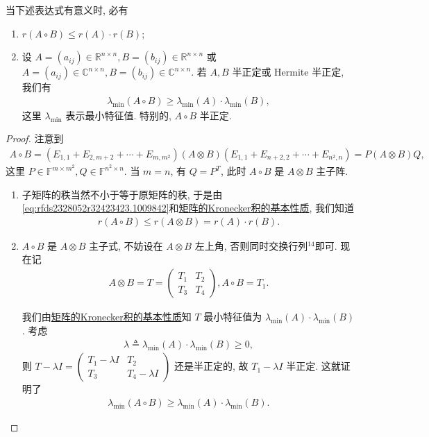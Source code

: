 \documentclass[../../main.tex]{subfiles}
\begin{document}
\begin{theorem}[矩阵的Hadamard积的性质]
当下述表达式有意义时, 必有
\begin{enumerate}
\item $r(A\circ B)\leqslant r(A)\cdot r(B)$;

\item 设 $A=(a_{ij})\in\mathbb{R}^{n\times n}, B=(b_{ij})\in\mathbb{R}^{n\times n}$ 或 $A=(a_{ij})\in\mathbb{C}^{n\times n}, B=(b_{ij})\in\mathbb{C}^{n\times n}$. 若 $A,B$ 半正定或 Hermite 半正定, 我们有
\begin{align*}
\lambda_{\min}(A\circ B)\geqslant \lambda_{\min}(A)\cdot\lambda_{\min}(B),
\end{align*}
这里 $\lambda_{\min}$ 表示最小特征值. 特别的, $A\circ B$ 半正定.
\end{enumerate}
\end{theorem}
\begin{proof}
注意到
\begin{align}\label{eq:rfds2328052r32423423.1009842}
A\circ B=(E_{1,1}+E_{2,m+2}+\cdots+E_{m,m^2})(A\otimes B)(E_{1,1}+E_{n+2,2}+\cdots+E_{n^2,n})=P(A\otimes B)Q,
\end{align}
这里 $P\in\mathbb{F}^{m\times m^2}, Q\in\mathbb{F}^{n^2\times n}$. 当 $m=n$, 有 $Q=P^T$, 此时 $A\circ B$ 是 $A\otimes B$ 主子阵. 
\begin{enumerate}
\item 子矩阵的秩当然不小于等于原矩阵的秩, 于是由\eqref{eq:rfds2328052r32423423.1009842}和\hyperref[theorem:矩阵的Kronecker积的基本性质]{矩阵的Kronecker积的基本性质}, 我们知道
\begin{align*}
r(A\circ B)\leqslant r(A\otimes B)=r(A)\cdot r(B).
\end{align*}

\item $A\circ B$ 是 $A\otimes B$ 主子式, 不妨设在 $A\otimes B$ 左上角, 否则同时交换行列$^{14}$即可. 现在记
\begin{align*}
A\otimes B=T=\begin{pmatrix}T_1&T_2\\T_3&T_4\end{pmatrix}, A\circ B=T_1.
\end{align*}

我们由\hyperref[theorem:矩阵的Kronecker积的基本性质]{矩阵的Kronecker积的基本性质}知 $T$ 最小特征值为 $\lambda_{\min}(A)\cdot\lambda_{\min}(B)$. 考虑
\begin{align*}
\lambda\triangleq\lambda_{\min}(A)\cdot\lambda_{\min}(B)\geqslant 0,
\end{align*}
则 $T-\lambda I=\begin{pmatrix}T_1-\lambda I&T_2\\T_3&T_4-\lambda I\end{pmatrix}$ 还是半正定的, 故 $T_1-\lambda I$ 半正定. 这就证明了
\begin{align*}
\lambda_{\min}(A\circ B)\geqslant \lambda_{\min}(A)\cdot\lambda_{\min}(B).
\end{align*}
\end{enumerate}

\end{proof}
\end{document}
